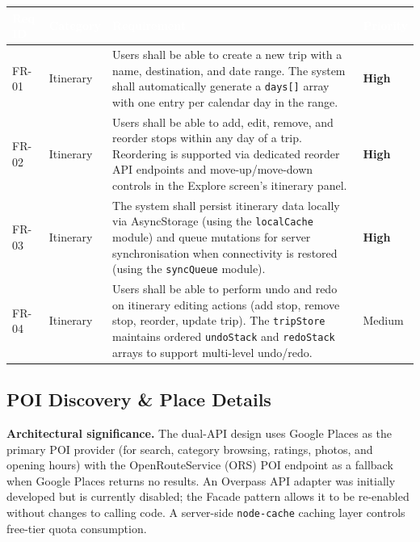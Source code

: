 \documentclass[12pt, a4paper]{article}
\newcommand{\reqid}[1]{\textsc{\small #1}}
\newcommand{\high}{\textbf{High}}
\newcommand{\medium}{Medium}
\newcommand{\thcell}[1]{\textcolor{white}{\textbf{\small #1}}}
\begin{document}
\vspace{0.4em}
\begin{longtable}{C{1.6cm} C{2.0cm} L{8.2cm} C{1.8cm}}
\toprule
{}
\thcell{Req ID} & \thcell{Category} & \thcell{Requirement} & \thcell{Priority} \\
\midrule
\endhead
\bottomrule
\endfoot

\reqid{FR-01} & Itinerary &
Users shall be able to create a new trip with a name, destination, and date range. The system shall automatically generate a \texttt{days[]} array with one entry per calendar day in the range. &
\high \\

\reqid{FR-02} & Itinerary &
Users shall be able to add, edit, remove, and reorder stops within any day of a trip. Reordering is supported via dedicated reorder API endpoints and move-up/move-down controls in the Explore screen's itinerary panel. &
\high \\

\reqid{FR-03} & Itinerary &
The system shall persist itinerary data locally via AsyncStorage (using the \texttt{localCache} module) and queue mutations for server synchronisation when connectivity is restored (using the \texttt{syncQueue} module). &
\high \\

\reqid{FR-04} & Itinerary &
Users shall be able to perform undo and redo on itinerary editing actions (add stop, remove stop, reorder, update trip). The \texttt{tripStore} maintains ordered \texttt{undoStack} and \texttt{redoStack} arrays to support multi-level undo/redo. &
\medium \\

\end{longtable}

\subsection{POI Discovery \& Place Details}

\begin{tcolorbox}[notebox]
  \textbf{Architectural significance.} The dual-API design uses Google Places as the primary POI provider (for search, category browsing, ratings, photos, and opening hours) with the OpenRouteService (ORS) POI endpoint as a fallback when Google Places returns no results. An Overpass API adapter was initially developed but is currently disabled; the Facade pattern allows it to be re-enabled without changes to calling code. A server-side \texttt{node-cache} caching layer controls free-tier quota consumption.
\end{tcolorbox}
\end{document}
